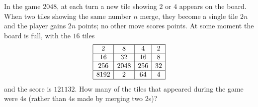 In the game $2048$, at each turn a new tile showing $2$ or $4$ appears on the board. When two tiles showing the same number $n$ merge, they become a single tile $2n$ and the player gains $2n$ points; no other move scores points. At some moment the board is full, with the $16$ tiles
\[\begin{array}{|c|c|c|c|}\hline 2&8&4&2\\\hline16&32&16&8\\\hline256&2048&256&32\\\hline8192&2&64&4\\\hline\end{array}\]
and the score is $121132$. How many of the tiles that appeared during the game were $4$s (rather than $4$s made by merging two $2$s)?
